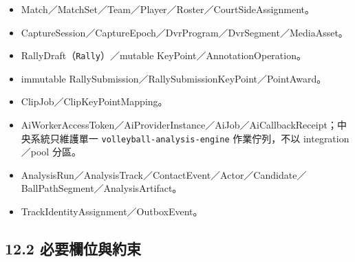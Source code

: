 \documentclass[
  9pt,
  a4paper,
]{article}
\providecommand{\tightlist}{%
  \setlength{\itemsep}{0pt}\setlength{\parskip}{0pt}}
\begin{document}
\begin{itemize}
\tightlist
\item
  Match／MatchSet／Team／Player／Roster／CourtSideAssignment。
\item
  CaptureSession／CaptureEpoch／DvrProgram／DvrSegment／MediaAsset。
\item
  RallyDraft（\texttt{Rally}）／mutable KeyPoint／AnnotationOperation。
\item
  immutable RallySubmission／RallySubmissionKeyPoint／PointAward。
\item
  ClipJob／ClipKeyPointMapping。
\item
AiWorkerAccessToken／AiProviderInstance／AiJob／AiCallbackReceipt；中央系統只維護單一 \texttt{volleyball-analysis-engine} 作業佇列，不以 integration／pool 分區。
\item
  AnalysisRun／AnalysisTrack／ContactEvent／Actor／Candidate／BallPathSegment／AnalysisArtifact。
\item
  TrackIdentityAssignment／OutboxEvent。
\end{itemize}

\subsection{12.2
必要欄位與約束}\label{122-ux5fc5ux8981ux6b04ux4f4dux8207ux7d04ux675f}
\end{document}

